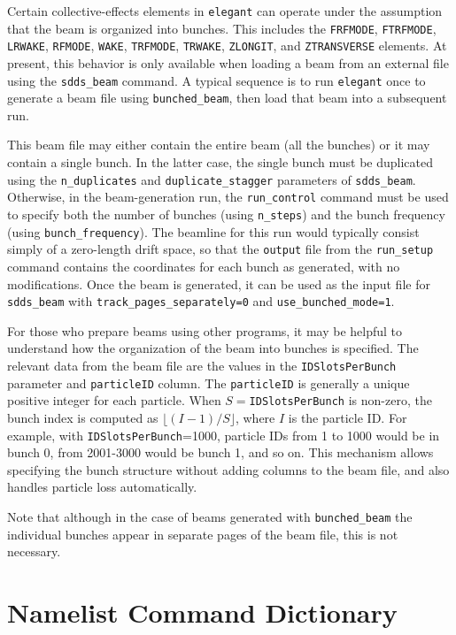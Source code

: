 \documentclass[11pt]{article}
\begin{document}
Certain collective-effects elements in {\tt elegant} can operate under the assumption that the beam is organized into bunches.
This includes the {\tt FRFMODE}, {\tt FTRFMODE}, {\tt LRWAKE}, {\tt RFMODE}, {\tt WAKE}, {\tt TRFMODE}, {\tt TRWAKE}, {\tt ZLONGIT}, and {\tt ZTRANSVERSE} elements.
At present, this behavior is only available when loading a beam from an external file using the \verb|sdds_beam| command.
A typical sequence is to run {\tt elegant} once to generate a beam file using \verb|bunched_beam|, then load that beam into a subsequent run.

This beam file may either contain the entire beam (all the bunches) or it may contain a single bunch.
In the latter case, the single bunch must be duplicated using the \verb|n_duplicates| and \verb|duplicate_stagger| parameters of \verb|sdds_beam|.
Otherwise, in the beam-generation run, 
the \verb|run_control| command must be used to specify both the number of bunches (using \verb|n_steps|) and the bunch frequency (using
\verb|bunch_frequency|).
The beamline for this run would typically consist simply of a zero-length drift space, so that the \verb|output| file from the \verb|run_setup| command
contains the coordinates for each bunch as generated, with no modifications.
Once the beam is generated, it can be used as the input file for \verb|sdds_beam| with \verb|track_pages_separately=0| and \verb|use_bunched_mode=1|.

For those who prepare beams using other programs, it may be helpful to understand how the organization of the beam into bunches is specified.
The relevant data from the beam file are the values in the \verb|IDSlotsPerBunch| parameter and \verb|particleID| column.
The \verb|particleID| is generally a unique positive integer for each particle.
When  $S=$\verb|IDSlotsPerBunch| is non-zero, the bunch index is computed as $\lfloor (I-1)/S\rfloor$, where $I$ is the particle ID.
For example, with \verb|IDSlotsPerBunch|=1000, particle IDs from 1 to 1000 would be in bunch 0, from 2001-3000 would be bunch 1, and so on.
This mechanism allows specifying the bunch structure without adding columns to the beam file, and also handles particle loss automatically.

Note that although in the case of beams generated with \verb|bunched_beam| the individual bunches appear in separate pages of the beam file, this is not
necessary.

\section{Namelist Command Dictionary}
\end{document}
